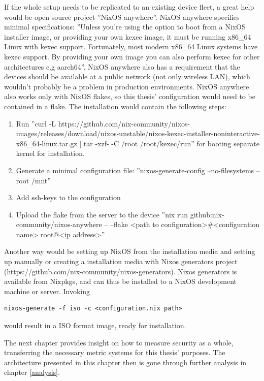 If the whole setup needs to be replicated to an existing device fleet,
a great help would be open source project ''NixOS anywhere''. NixOS
anywhere specifies minimal specifications: ''Unless you're using the
option to boot from a NixOS installer image, or providing your own
kexec image, it must be running x86\_64 Linux with kexec
support. Fortunately, most modern x86\_64 Linux systems have kexec
support. By providing your own image you can also perform kexec for
other architectures e.g aarch64''. NixOS anywhere also has a
requirement that the devices should be available at a public network
(not only wireless LAN), which wouldn't probably be a problem in
production environments. NixOS anywhere also works only with NixOS
flakes, so this thesis' configuration would need to be contained in a
flake. \cite{githubGitHubNixcommunitynixosanywhere}
The installation would contain the following steps:
\begin{enumerate}
  \item Run ''curl -L
    https://github.com/nix-community/nixos-images/releases/download/nixos-unstable/nixos-kexec-installer-noninteractive-x86\_64-linux.tar.gz
    | tar -xzf- -C /root /root/kexec/run'' for booting separate kernel
    for installation.
  \item Generate a minimal configuration file: ''nixos-generate-config
    --no-filesystems --root /mnt''
  \item Add ssh-keys to the configuration
  \item Upload the flake from the server to the device ''nix run
    github:nix-community/nixos-anywhere -- --flake <path to
    configuration>#<configuration name> root@<ip address>''
\end{enumerate}
Another way would be setting up NixOS from the installation media and
setting up manually or creating a installation media with Nixos
generators project
(https://github.com/nix-community/nixos-generators). Nixos generators
is available from Nixpkgs, and can thus be installed to a NixOS
development machine or server. Invoking
\begin{lstlisting}
nixos-generate -f iso -c <configuration.nix path>
\end{lstlisting}
would result in a ISO format image, ready for
installation. \cite{githubGitHubNixcommunitynixosanywhere}

The next chapter provides insight on how to measure security
as a whole, transferring the necessary metric systems for this thesis'
purposes. The architecture presented in this chapter then is gone through
further analysis in chapter \ref{analysis}.
